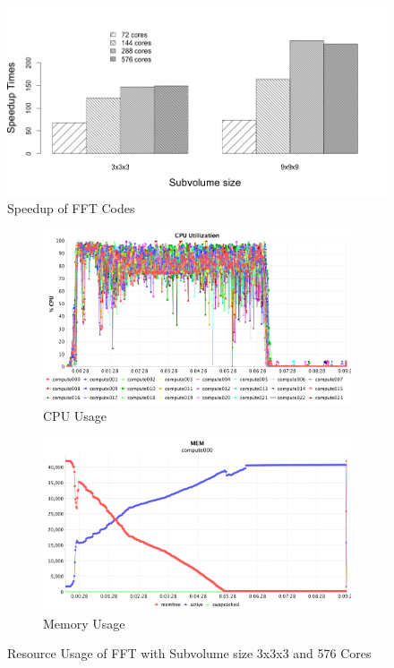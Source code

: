 \begin{figure}[h]
\includegraphics[scale=.50]{figures/FFTSpeedup.png}
\caption{Speedup of FFT Codes}
\label{FFTSpeedup}
\end{figure}
 

\begin{figure}[h]
\centering
\begin{subfigure}{1\textwidth}
  \centering
  \includegraphics[width=1\linewidth]{figures/FFT131_576_CPU.png}
  \caption{CPU Usage}
  \label{FFT131_576_CPU}
\end{subfigure}
\begin{subfigure}{1\textwidth}
  \centering
  \includegraphics[width=1\linewidth]{figures/FFT131_576_MEM.png}
  \caption{Memory Usage}
  \label{FFT131_576_MEM}
\end{subfigure}
\caption{Resource Usage of FFT with Subvolume size 3x3x3 and 576 Cores}
\label{FFT131_576}
\end{figure}


